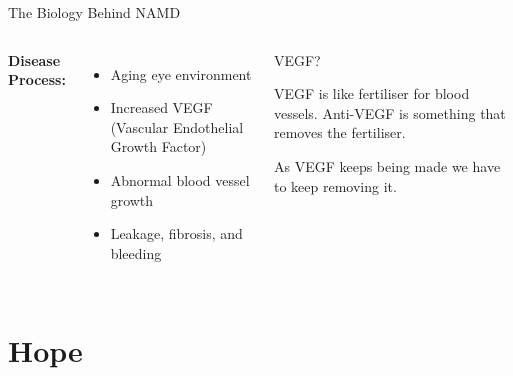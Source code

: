 \documentclass[10pt,aspectratio=169]{beamer}
\begin{document}
\begin{frame}{The Biology Behind NAMD}
\begin{columns}[T]
\textbf{Disease Process:}
\begin{itemize}
    \item Aging eye environment
    \item Increased VEGF (Vascular Endothelial Growth Factor)
    \item Abnormal blood vessel growth
    \item Leakage, fibrosis, and bleeding
\end{itemize}

\begin{exampleblock}{VEGF?}

  VEGF is like fertiliser for blood vessels. Anti-VEGF is something that removes the fertiliser.

  As VEGF keeps being made we have to keep removing it.
  \end{exampleblock}
\end{columns}
\end{frame}

{
\section{Hope}
}
\end{document}
